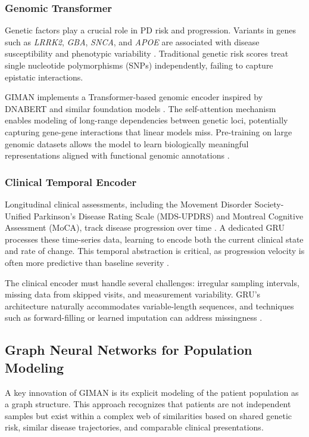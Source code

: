 \documentclass[conference]{IEEEtran}
\begin{document}
\subsubsection{Genomic Transformer}
Genetic factors play a crucial role in PD risk and progression. Variants in genes such as \textit{LRRK2}, \textit{GBA}, \textit{SNCA}, and \textit{APOE} are associated with disease susceptibility and phenotypic variability \cite{nalls2019identification}. Traditional genetic risk scores treat single nucleotide polymorphisms (SNPs) independently, failing to capture epistatic interactions.

GIMAN implements a Transformer-based genomic encoder inspired by DNABERT and similar foundation models \cite{ji2021dnabert}. The self-attention mechanism enables modeling of long-range dependencies between genetic loci, potentially capturing gene-gene interactions that linear models miss. Pre-training on large genomic datasets allows the model to learn biologically meaningful representations aligned with functional genomic annotations \cite{avsec2021effective}.

\subsubsection{Clinical Temporal Encoder}
Longitudinal clinical assessments, including the Movement Disorder Society-Unified Parkinson's Disease Rating Scale (MDS-UPDRS) and Montreal Cognitive Assessment (MoCA), track disease progression over time \cite{goetz2008movement}. A dedicated GRU processes these time-series data, learning to encode both the current clinical state and rate of change. This temporal abstraction is critical, as progression velocity is often more predictive than baseline severity \cite{holden2018progression}.

The clinical encoder must handle several challenges: irregular sampling intervals, missing data from skipped visits, and measurement variability. GRU's architecture naturally accommodates variable-length sequences, and techniques such as forward-filling or learned imputation can address missingness \cite{che2018recurrent}.

\subsection{Graph Neural Networks for Population Modeling}

A key innovation of GIMAN is its explicit modeling of the patient population as a graph structure. This approach recognizes that patients are not independent samples but exist within a complex web of similarities based on shared genetic risk, similar disease trajectories, and comparable clinical presentations.
\end{document}
